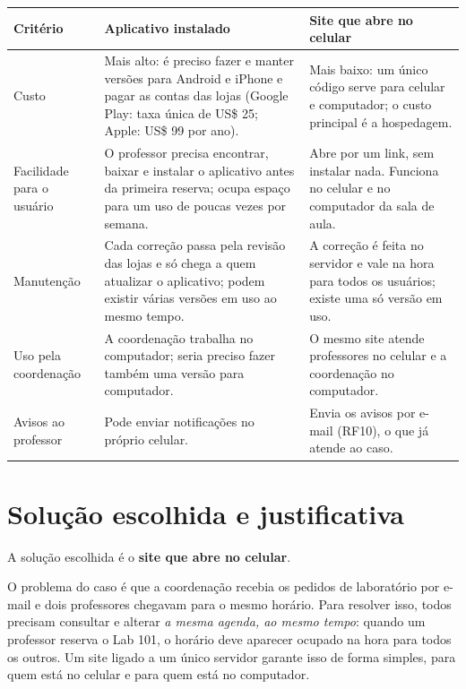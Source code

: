 \documentclass[a4paper,12pt]{article}
\begin{document}
\begin{xltabular}{\linewidth}{|>{\raggedright\arraybackslash}p{2.9cm}|Y|Y|}
  \hline
  \textbf{Critério} & \textbf{Aplicativo instalado} & \textbf{Site que abre no celular} \\ \hline
  \endhead
  Custo & Mais alto: é preciso fazer e manter versões para Android e iPhone e pagar as contas das lojas (Google Play: taxa única de US\$ 25; Apple: US\$ 99 por ano). & Mais baixo: um único código serve para celular e computador; o custo principal é a hospedagem. \\ \hline
  Facilidade para o usuário & O professor precisa encontrar, baixar e instalar o aplicativo antes da primeira reserva; ocupa espaço para um uso de poucas vezes por semana. & Abre por um link, sem instalar nada. Funciona no celular e no computador da sala de aula. \\ \hline
  Manutenção & Cada correção passa pela revisão das lojas e só chega a quem atualizar o aplicativo; podem existir várias versões em uso ao mesmo tempo. & A correção é feita no servidor e vale na hora para todos os usuários; existe uma só versão em uso. \\ \hline
  Uso pela coordenação & A coordenação trabalha no computador; seria preciso fazer também uma versão para computador. & O mesmo site atende professores no celular e a coordenação no computador. \\ \hline
  Avisos ao professor & Pode enviar notificações no próprio celular. & Envia os avisos por e-mail (RF10), o que já atende ao caso. \\ \hline
\end{xltabular}

\section{Solução escolhida e justificativa}

A solução escolhida é o \textbf{site que abre no celular}.

O problema do caso é que a coordenação recebia os pedidos de laboratório
por e-mail e dois professores chegavam para o mesmo horário. Para
resolver isso, todos precisam consultar e alterar \emph{a mesma agenda,
ao mesmo tempo}: quando um professor reserva o Lab 101, o horário deve
aparecer ocupado na hora para todos os outros. Um site ligado a um único
servidor garante isso de forma simples, para quem está no celular e para
quem está no computador.
\end{document}
